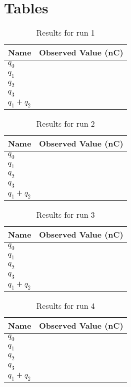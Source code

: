 \section{Tables}
\begin{table}[ht]
	\centering
	\begin{tabular}{|l|r|}
		\hline
		Name & Observed Value (nC) \\
		\hline
		$q_{0}$ & \\
		$q_{1}$ & \\
		$q_{2}$ & \\
		$q_{3}$ & \\
		$q_{1} + q_{2}$ & \\
		\hline
	\end{tabular}
	\caption{Results for run 1}
	\label{table_01_run_1}
\end{table}
\begin{table}[ht]
	\centering
	\begin{tabular}{|l|r|}
		\hline
		Name & Observed Value (nC) \\
		\hline
		$q_{0}$ & \\
		$q_{1}$ & \\
		$q_{2}$ & \\
		$q_{3}$ & \\
		$q_{1} + q_{2}$ & \\
		\hline
	\end{tabular}
	\caption{Results for run 2}
	\label{table_01_run_2}
\end{table}
\begin{table}[ht]
	\centering
	\begin{tabular}{|l|r|}
		\hline
		Name & Observed Value (nC) \\
		\hline
		$q_{0}$ & \\
		$q_{1}$ & \\
		$q_{2}$ & \\
		$q_{3}$ & \\
		$q_{1} + q_{2}$ & \\
		\hline
	\end{tabular}
	\caption{Results for run 3}
	\label{table_01_run_3}
\end{table}
\begin{table}[ht]
	\centering
	\begin{tabular}{|l|r|}
		\hline
		Name & Observed Value (nC) \\
		\hline
		$q_{0}$ & \\
		$q_{1}$ & \\
		$q_{2}$ & \\
		$q_{3}$ & \\
		$q_{1} + q_{2}$ & \\
		\hline
	\end{tabular}
	\caption{Results for run 4}
	\label{table_01_run_4}
\end{table}
